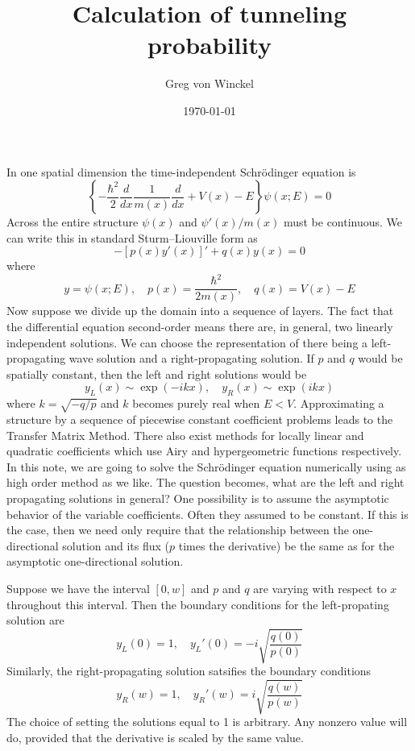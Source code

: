 \documentclass[a4paper,12pt]{article}
\title{Calculation of tunneling probability}
\author{Greg von Winckel}
\date{\today}
\begin{document}
\maketitle
In one spatial dimension the time-independent Schr\"odinger equation is
\begin{equation}
\left\{-\frac{\hbar^2}{2}\frac{d}{dx}\frac{1}{m(x)}\frac{d}{dx}+V(x)-E\right\}
\psi(x;E)=0
\end{equation}
Across the entire structure $\psi(x)$ and $\psi'(x)/m(x)$ must be continuous. We can write
this in standard Sturm--Liouville form as
\begin{equation}
-[p(x)y'(x)]'+q(x)y(x)=0 
\label{eqn:slprob}
\end{equation}
where 
\begin{equation}
y=\psi(x;E),\quad p(x)=\frac{\hbar^2}{2m(x)},\quad q(x)=V(x)-E 
\end{equation}
Now suppose we divide up the domain into a sequence of layers. The fact that
the differential equation second-order means there are, in general, two linearly independent solutions. We can choose the representation of there being a left-propagating wave 
solution and a right-propagating solution. If $p$ and $q$ would be spatially constant,
then the left and right solutions would be
\begin{equation}
y_L(x) \sim \exp(-ikx),\quad y_R(x) \sim \exp(ikx)
\end{equation}
where $k=\sqrt{-q/p}$ and $k$ becomes purely real when $E<V$. Approximating 
a structure by a sequence of piecewise constant coefficient problems leads to the 
Transfer Matrix Method. There also exist methods for locally linear and quadratic coefficients which use Airy and hypergeometric functions respectively. In this note,
we are going to solve the Schr\"odinger equation numerically using as high order method as we like. The question becomes, what are the left and right propagating solutions in general? One possibility is to assume the asymptotic behavior of the variable coefficients. Often they assumed to be constant. If this is the case, then we need only require that the relationship between the one-directional solution and its flux ($p$ times the derivative) be the same as for the asymptotic one-directional solution.

Suppose we have the interval $[0,w]$ and $p$ and $q$ are varying with respect to $x$ 
throughout this interval. Then the boundary conditions for the left-propating solution are
\begin{equation}
y_L(0) = 1,\quad y_L'(0) = -i\sqrt{\frac{q(0)}{p(0)}}
\end{equation}
Similarly, the right-propagating solution satsifies the boundary conditions
\begin{equation}
y_R(w) = 1,\quad y_R'(w) = i\sqrt{\frac{q(w)}{p(w)}}
\end{equation}
The choice of setting the solutions equal to 1 is arbitrary. Any nonzero value will do, provided that the derivative is scaled by the same value. 
\end{document}

